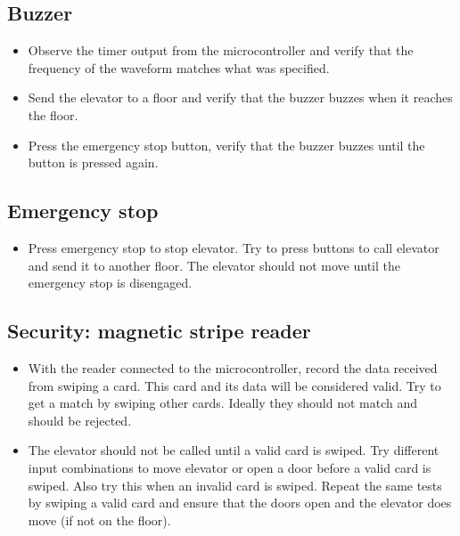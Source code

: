 \documentclass{article}
\begin{document}
	    \subsection{Buzzer}
	    \begin{itemize}
	        \item Observe the timer output from the microcontroller and verify that the frequency of the waveform matches what was specified.
	        \item Send the elevator to a floor and verify that the buzzer buzzes when it reaches the floor.
	        \item Press the emergency stop button, verify that the buzzer buzzes until the button is pressed again.
	    \end{itemize}
	    
	    \subsection{Emergency stop}
	    \begin{itemize}
	        \item Press emergency stop to stop elevator. Try to press buttons to call elevator and send it to another floor. The elevator should not move until the emergency stop is disengaged.
	    \end{itemize}
	    
	    \subsection{Security: magnetic stripe reader}
	    \begin{itemize}
	        \item With the reader connected to the microcontroller, record the data received from swiping a card. This card and its data will be considered valid. Try to get a match by swiping other cards. Ideally they should not match and should be rejected.
	        \item The elevator should not be called until a valid card is swiped. Try different input combinations to move elevator or open a door before a valid card is swiped. Also try this when an invalid card is swiped. Repeat the same tests by swiping a valid card and ensure that the doors open and the elevator does move (if not on the floor).
	    \end{itemize}
	    
\end{document}

